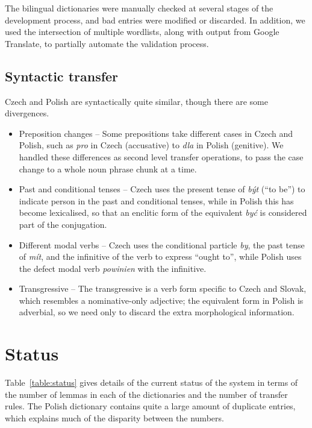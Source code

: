 \documentclass[11pt]{article}
\begin{document}
The bilingual dictionaries were manually checked at several stages of the development 
process, and bad entries were modified or discarded. In addition, we used the intersection
of multiple wordlists, along with output from Google Translate, to partially automate
the validation process.

\subsection{Syntactic transfer}

Czech and Polish are syntactically quite similar, though there are some divergences.

\begin{itemize}
\item Preposition changes -- Some prepositions take different cases in Czech and Polish,
such as \emph{pro} in Czech (accusative) to \emph{dla} in Polish (genitive). We handled
these differences as second level transfer operations, to pass the case change to a whole noun
phrase chunk at a time.
\item Past and conditional tenses -- Czech uses the present tense of \emph{být} (``to be'') to 
indicate person in the past and conditional tenses, while in Polish this has become
lexicalised, so that an enclitic form of the equivalent \emph{być} is considered part
of the conjugation.
\item Different modal verbs -- Czech uses the conditional particle \emph{by}, the past tense
of \emph{mít}, and the infinitive of the verb to express ``ought to'', while Polish uses
the defect modal verb \emph{powinien} with the infinitive.%
\item Transgressive -- The transgressive is a verb form specific to Czech and
Slovak, which resembles a nominative-only adjective; the equivalent form in Polish is
adverbial, so we need only to discard the extra morphological information.
\end{itemize}

\section{Status}

Table~\ref{table:status} gives details of the current status of the system
in terms of the number of lemmas in each of the dictionaries and the number 
of transfer rules. The Polish dictionary contains quite a large amount of
duplicate entries, which explains much of the disparity between the numbers.
\end{document}
